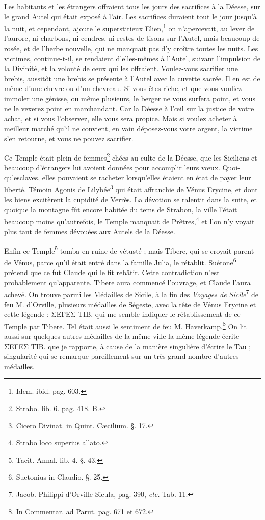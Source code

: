 \documentclass[a4paper, 11pt, oneside, polutonikogreek, french]{article}
\begin{document}
Les habitants et les étrangers offraient tous les jours des sacrifices à la Déesse, sur le grand Autel qui était exposé à l'air. Les sacrifices duraient tout le jour jusqu'à la nuit, et cependant, ajoute le superstitieux Elien,\footnote{Idem. ibid. pag. 603.} on n'apercevait, au lever de l'aurore, ni charbons, ni cendres, ni restes de tisons sur l'Autel, mais beaucoup de rosée, et de l'herbe nouvelle, qui ne manquait pas d'y croître toutes les nuits. Les victimes, continue-t-il, se rendaient d'elles-mêmes à l'Autel, suivant l'impulsion de la Divinité, et la volonté de ceux qui les offraient. Voulez-vous sacrifier une brebis, aussitôt une brebis se présente à l'Autel avec la cuvette sacrée. Il en est de même d'une chevre ou d'un chevreau. Si vous êtes riche, et que vous vouliez immoler une génisse, ou même plusieurs, le berger ne vous surfera point, et vous ne le vexerez point en marchandant. Car la Déesse à l'œil sur la justice de votre achat, et si vous l'observez, elle vous sera propice. Mais si voulez acheter à meilleur marché qu'il ne convient, en vain déposez-vous votre argent, la victime s'en retourne, et vous ne pouvez sacrifier.

Ce Temple était plein de femmes\footnote{Strabo. lib. 6. pag. 418. B.} chées au culte de la Déesse, que les Siciliens et beaucoup d'étrangers lui avoient données pour accomplir leurs vœux. Quoi-qu'esclaves, elles pouvaient se racheter lorsqu'elles étaient en état de payer leur liberté. Témoin Agonis de Lilybée\footnote{Cicero Divinat. in Quint. Cæcilium. §. 17.} qui était affranchie de Vénus Erycine, et dont les biens excitèrent la cupidité de Verrès. La dévotion se ralentit dans la suite, et quoique la montagne fût encore habitée du tems de Strabon, la ville l'était beaucoup moins qu'autrefois, le Temple manquait de Prêtres,\footnote{Strabo loco superius allato.} et l'on n'y voyait plus tant de femmes dévouées aux Autels de la Déesse.

Enfin ce Temple\footnote{Tacit. Annal. lib. 4. §. 43.} tomba en ruine de vétusté ; mais Tibere, qui se croyait parent de Vénus, parce qu'il était entré dans la famille Julia, le rétablit. Suétone\footnote{Suetonius in Claudio. §. 25.} prétend que ce fut Claude qui le fit rebâtir. Cette contradiction n'est probablement qu'apparente. Tibere aura commencé l'ouvrage, et Claude l'aura achevé. On trouve parmi les Médailles de Sicile, à la fin des \emph{Voyages de Sicile}\footnote{Jacob. Philippi d'Orville Sicula, pag. 390, \emph{etc.} Tab. 11.} de feu M. d'Orville, plusieurs médailles de Ségeste, avec la tête de Vénus Erycine et cette légende : ΣΕΓΕΣ ΤΙΒ. qui me semble indiquer le rétablissement de ce Temple par Tibere. Tel était aussi le sentiment de feu M. Haverkamp.\footnote{In Commentar. ad Parut. pag. 671 et 672.} On lit aussi sur quelques autres médailles de la même ville la même légende écrite ΣΕΓΕΣ ΤΙΒ. que je rapporte, à cause de la manière singulière d'écrire le Tau ; singularité qui se remarque pareillement sur un très-grand nombre d'autres médailles.
\end{document}

